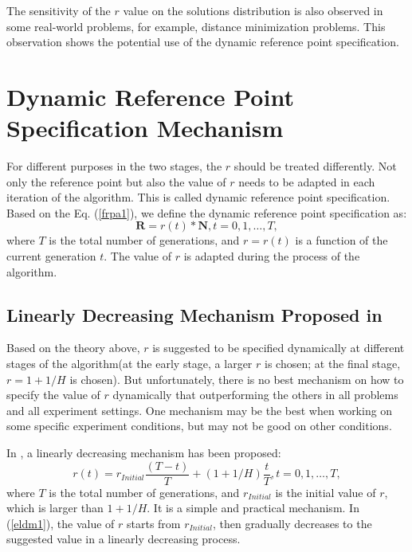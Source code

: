 \documentclass[conference]{IEEEtran}
\begin{document}
The sensitivity of the $r$ value on the solutions distribution is also observed in some real-world problems,
for example, distance minimization problems. 
This observation shows the potential use of the dynamic reference point specification\cite{hisao:dynamic}.

\section{Dynamic Reference Point Specification Mechanism}
For different purposes in the two stages, the $r$ should be treated differently\cite{hisao:dynamic}. 
Not only the reference point but also the value of $r$ 
needs to be adapted in each iteration of the algorithm. 
This is called dynamic reference point specification. 
Based on the Eq. (\ref{frpa1}), 
we define the dynamic reference point specification as:
\begin{equation}\label{f2}
  \boldsymbol R = r(t) * \boldsymbol N, 
  t=0,1,\dots,T,
\end{equation}
where $T$ is the total number of generations, and $r=r(t)$ is a function of the current generation $t$.
The value of $r$ is adapted during the process of the algorithm. 

% 
\subsection{Linearly Decreasing Mechanism Proposed in \cite{hisao:dynamic}} 
Based on the theory above, $r$ is suggested to be specified dynamically at different stages of
the algorithm(at the early stage, a larger $r$ is chosen; at the final stage, $r=1+1/H$ is chosen).
But unfortunately, there is no best mechanism on how to specify the value of $r$ dynamically
that outperforming the others in all problems and all experiment settings. One mechanism may be the best
when working on some specific experiment conditions, but may not be good on other conditions. 

In \cite{hisao:dynamic}, a linearly decreasing mechanism has been proposed:
\begin{equation}\label{eldm1}
  r(t)=r_{Initial}\frac{(T-t)}{T}+(1+1/H)\frac{t}{T}, t=0,1,\dots,T,
\end{equation}
where $T$ is the total number of generations, and $r_{Initial}$ is the initial value of $r$,
which is larger than $1+1/H$. 
It is a simple and practical mechanism. In (\ref{eldm1}), the value of $r$ starts from $r_{Initial}$,
then gradually decreases to the suggested value in a linearly decreasing process. 
\end{document}
